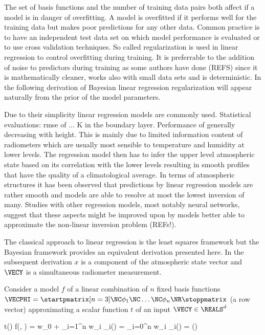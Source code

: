     The set of basis functions and the number of training data pairs both
    affect if a model is in danger of overfitting. A model is overfitted if it
    performs well for the training data but makes poor predictions for any
    other data. Common practice is to have an independent test data set on
    which model performance is evaluated or to use cross validation techniques.
    So called regularization is used in linear regression to control
    overfitting during training. It is preferrable to the addition of noise
    to predictors during training as some authors have done (REFS) since it is
    mathematically cleaner, works also with small data sets and is
    deterministic. In the following derivation of Bayesian linear regression
    regularization will appear naturally from the prior of the model
    parameters.

    Due to their simplicity linear regression models are commonly used.
    Statistical evaluations: rmse of ... K in the boundary layer. Performance
    of generally decreasing with height. This is mainly due to limited
    information content of radiometers which are usually most sensible to
    temperature and humidity at lower levels. The regression model then has to
    infer the upper level atmospheric state based on its correlation with
    the lower levels resulting in smooth profiles that have the quality of a
    climatological average. In terms of atmospheric structures it has been
    observed that predictions by linear regression models are rather smooth and
    models are able to resolve at most the lowest inversion of many. Studies
    with other regression models, most notably neural networks, suggest that
    these aspects might be improved upon by models better able to approximate
    the non-linear inversion problem (REFs!).

    The classical approach to linear regression is the least squares framework
    but the Bayesian framework provides an equivalent derivation presented
    here. In the subsequent derivation $x$ is a component of the atmospheric
    state vector and $\VECY$ is a  simultaneous radiometer measurement.

    Consider a model $f$ of a linear combination of $n$ fixed basis functions
    $\VECPHI = \startpmatrix[n=3] \NC \phi_1 \NC \dots \NC \phi_n \NR
    \stoppmatrix$ (a row vector) approximating a scalar
    function $t$ of an input $\VECY \in \REALS^d$

    \startformula
        t(\VECY) \approx f(\VECY, \VECW) = w_0 + \sum_{i=1}^n w_i \phi_i(\VECY)
            = \sum_{i=0}^n w_i \phi_i(\VECY) = \VECPHI(\VECY) \VECW
    \stopformula

